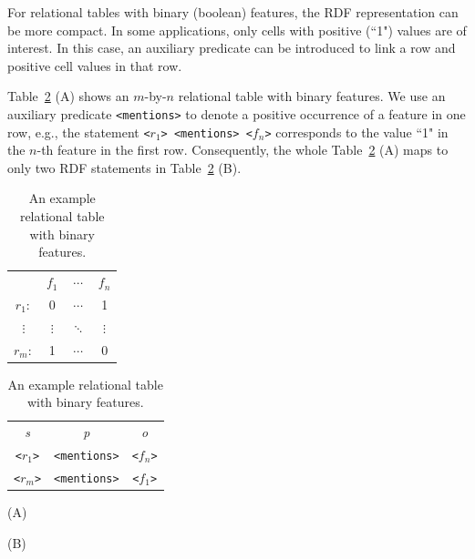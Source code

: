 For relational tables with binary (boolean) features, the RDF representation can be more compact. In some applications, only cells with positive (``1") values are of interest. In this case, an auxiliary predicate can be introduced to link a row and positive cell values in that row.

\begin{myexp}
\label{exp:repBinRDB}
Table~\ref{tbl:binary-rel} (A) shows an $m$-by-$n$ relational table with binary features. We use an auxiliary predicate \texttt{<mentions>} to denote a positive occurrence of a feature in one row, e.g., the statement \texttt{<$r_1$> <mentions> <$f_n$>} corresponds to the value ``1" in the $n$-th feature in the first row. Consequently, the whole Table~\ref{tbl:binary-rel} (A) maps to only two RDF statements in Table~\ref{tbl:binary-rel} (B).
\end{myexp}


\begin{table}[ht]
\begin{minipage}[b]{0.38\linewidth}\begin{flushright}
\begin{tabular}{ c | c | c | c |}
\cline{2-4}
	~   & $f_1$	    & $\cdots$  & $f_n$   \\
\cline{2-4}
$r_1:$	&  0  	& $\cdots$   &    1  \\
\cline{2-4}
$\vdots$& $\vdots$  & $\ddots$  & $\vdots$\\
\cline{2-4}
$r_m:$	&  1  	& $\cdots$   &    0  \\
\cline{2-4}
\end{tabular}
\end{flushright}
\end{minipage}
\hfill
\begin{minipage}[b]{0.4\linewidth}
\begin{tabular}{c c c}
\emph{s}&   \emph{p}&  \emph{o}\\
\texttt{<$r_1$>}   &    \texttt{<mentions>}   &  \texttt{<$f_n$>}\\
\texttt{<$r_m$>}   &    \texttt{<mentions>}   &  \texttt{<$f_1$>}\\
\end{tabular}
\end{minipage}
\begin{minipage}[c]{0.4\linewidth}\centering
\vspace{0.2cm}\hspace{2.8cm}(A)
\end{minipage}
\begin{minipage}[c]{0.4\linewidth}\centering
\vspace{0.2cm}\hspace{3.5cm}(B)
\end{minipage}
\caption{\label{tbl:binary-rel} An example relational table with binary features.}
\end{table}

